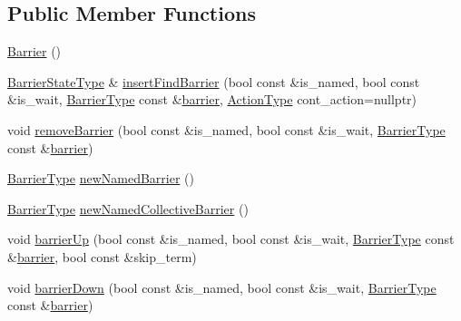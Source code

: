 \subsection*{Public Member Functions}
\begin{DoxyCompactItemize}
\item 
\hyperlink{structvt_1_1collective_1_1barrier_1_1_barrier_aa69e5135299fa366a2c59ac96a9f318d}{Barrier} ()
\item 
\hyperlink{structvt_1_1collective_1_1barrier_1_1_barrier_a9b612818f7b44ca65f2caee0dee094f3}{Barrier\+State\+Type} \& \hyperlink{structvt_1_1collective_1_1barrier_1_1_barrier_aa3f74f986e523701c1d85ed97d3ad5a4}{insert\+Find\+Barrier} (bool const \&is\+\_\+named, bool const \&is\+\_\+wait, \hyperlink{namespacevt_a25e481f0d6bbc7204db23d1c87a62e77}{Barrier\+Type} const \&\hyperlink{structvt_1_1collective_1_1barrier_1_1_barrier_a05124050c7d353a4f3475ee1875dd46a}{barrier}, \hyperlink{namespacevt_ae0a5a7b18cc99d7b732cb4d44f46b0f3}{Action\+Type} cont\+\_\+action=nullptr)
\item 
void \hyperlink{structvt_1_1collective_1_1barrier_1_1_barrier_a56128065b0b7735958b998dd97a4938b}{remove\+Barrier} (bool const \&is\+\_\+named, bool const \&is\+\_\+wait, \hyperlink{namespacevt_a25e481f0d6bbc7204db23d1c87a62e77}{Barrier\+Type} const \&\hyperlink{structvt_1_1collective_1_1barrier_1_1_barrier_a05124050c7d353a4f3475ee1875dd46a}{barrier})
\item 
\hyperlink{namespacevt_a25e481f0d6bbc7204db23d1c87a62e77}{Barrier\+Type} \hyperlink{structvt_1_1collective_1_1barrier_1_1_barrier_a0d8e74149ddca96f06c1ff6071b73a74}{new\+Named\+Barrier} ()
\item 
\hyperlink{namespacevt_a25e481f0d6bbc7204db23d1c87a62e77}{Barrier\+Type} \hyperlink{structvt_1_1collective_1_1barrier_1_1_barrier_a3e101519fbcfa9eee139bf02f991f085}{new\+Named\+Collective\+Barrier} ()
\item 
void \hyperlink{structvt_1_1collective_1_1barrier_1_1_barrier_a79096d77724cb095c08696e8af673dfb}{barrier\+Up} (bool const \&is\+\_\+named, bool const \&is\+\_\+wait, \hyperlink{namespacevt_a25e481f0d6bbc7204db23d1c87a62e77}{Barrier\+Type} const \&\hyperlink{structvt_1_1collective_1_1barrier_1_1_barrier_a05124050c7d353a4f3475ee1875dd46a}{barrier}, bool const \&skip\+\_\+term)
\item 
void \hyperlink{structvt_1_1collective_1_1barrier_1_1_barrier_a962a1cbd78c359e1dee7a8e7df5cfd75}{barrier\+Down} (bool const \&is\+\_\+named, bool const \&is\+\_\+wait, \hyperlink{namespacevt_a25e481f0d6bbc7204db23d1c87a62e77}{Barrier\+Type} const \&\hyperlink{structvt_1_1collective_1_1barrier_1_1_barrier_a05124050c7d353a4f3475ee1875dd46a}{barrier})

\end{DoxyCompactItemize}
